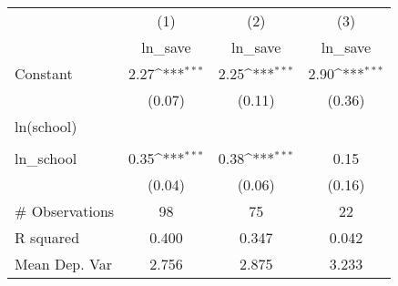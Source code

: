 {
\def\sym#1{\ifmmode^{#1}\else\(^{#1}\)\fi}
\begin{tabular}{l*{3}{c}}
\hline\hline
                    &\multicolumn{1}{c}{(1)}&\multicolumn{1}{c}{(2)}&\multicolumn{1}{c}{(3)}\\
                    &\multicolumn{1}{c}{ln\_save}&\multicolumn{1}{c}{ln\_save}&\multicolumn{1}{c}{ln\_save}\\
\hline
Constant            &        2.27\sym{***}&        2.25\sym{***}&        2.90\sym{***}\\
                    &      (0.07)         &      (0.11)         &      (0.36)         \\
[1em]
ln(school)          &                     &                     &                     \\
                    &                     &                     &                     \\
[1em]
ln\_school           &        0.35\sym{***}&        0.38\sym{***}&        0.15         \\
                    &      (0.04)         &      (0.06)         &      (0.16)         \\
\hline
\# Observations     &          98         &          75         &          22         \\
R squared           &       0.400         &       0.347         &       0.042         \\
Mean Dep. Var       &       2.756         &       2.875         &       3.233         \\
\hline\hline
\end{tabular}
}
